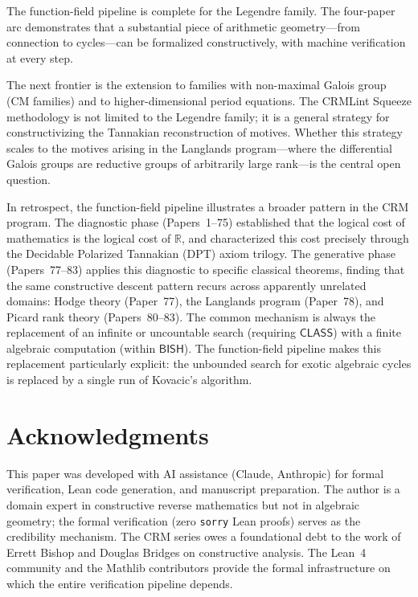 \documentclass[11pt]{article}
\theoremstyle{plain}
\theoremstyle{definition}
\theoremstyle{remark}
\newcommand{\R}{\mathbb{R}}
\newcommand{\BISH}{\mathsf{BISH}}
\newcommand{\CLASS}{\mathsf{CLASS}}
\begin{document}
The function-field pipeline is complete for the Legendre family.
The four-paper arc demonstrates that a substantial piece of arithmetic geometry---from connection to cycles---can be formalized constructively, with machine verification at every step.

The next frontier is the extension to families with non-maximal Galois group (CM families) and to higher-dimensional period equations.
The CRMLint Squeeze methodology is not limited to the Legendre family; it is a general strategy for constructivizing the Tannakian reconstruction of motives.
Whether this strategy scales to the motives arising in the Langlands program---where the differential Galois groups are reductive groups of arbitrarily large rank---is the central open question.

In retrospect, the function-field pipeline illustrates a broader pattern in the CRM program.
The diagnostic phase (Papers~1--75) established that the logical cost of mathematics is the logical cost of $\R$, and characterized this cost precisely through the Decidable Polarized Tannakian (DPT) axiom trilogy.
The generative phase (Papers~77--83) applies this diagnostic to specific classical theorems, finding that the same constructive descent pattern recurs across apparently unrelated domains: Hodge theory (Paper~77), the Langlands program (Paper~78), and Picard rank theory (Papers~80--83).
The common mechanism is always the replacement of an infinite or uncountable search (requiring $\CLASS$) with a finite algebraic computation (within $\BISH$).
The function-field pipeline makes this replacement particularly explicit: the unbounded search for exotic algebraic cycles is replaced by a single run of Kovacic's algorithm.

\section*{Acknowledgments}

This paper was developed with AI assistance (Claude, Anthropic) for formal verification, Lean code generation, and manuscript preparation.
The author is a domain expert in constructive reverse mathematics but not in algebraic geometry; the formal verification (zero \texttt{sorry} Lean proofs) serves as the credibility mechanism.
The CRM series owes a foundational debt to the work of Errett Bishop and Douglas Bridges on constructive analysis.
The Lean~4 community and the Mathlib contributors provide the formal infrastructure on which the entire verification pipeline depends.
\end{document}
